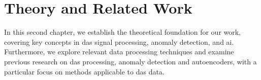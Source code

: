 \chapter{Theory and Related Work}
\label{chap:back}

In this second chapter, we establish the theoretical foundation for our work, covering key concepts in \acrshort{das} signal processing, anomaly detection, and \acrshort{ai}. Furthermore, we explore relevant data processing techniques and examine previous research on \acrshort{das} processing, anomaly detection and autoencoders, with a particular focus on methods applicable to \acrshort{das} data.





